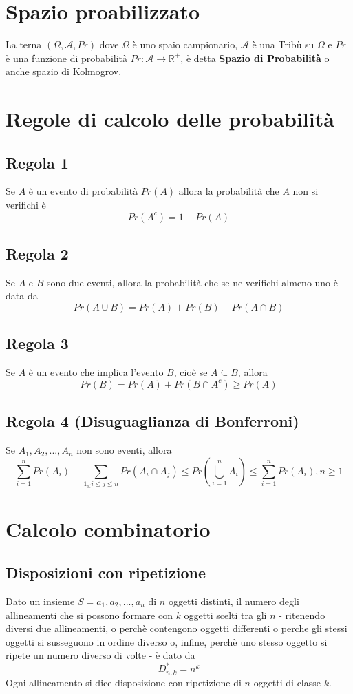 \documentclass[12pt]{report}
\begin{document}
  \section{Spazio proabilizzato}
  La terna $(\Omega, \mathcal{A}, Pr)$ dove $\Omega$ è uno spaio campionario, $\mathcal{A}$ è una Tribù su $\Omega$ e $Pr$ è una funzione di probabilità $Pr: \mathcal{A} \longrightarrow \mathbb{R^+}$, è detta \textbf{Spazio di Probabilità} o anche spazio di Kolmogrov.

  \section{Regole di calcolo delle probabilità}
  \subsection{Regola 1}
  Se $A$ è un evento di probabilità $Pr(A)$ allora la probabilità che $A$ non si verifichi è
  \[ Pr(A^c)=1-Pr(A) \]

  \subsection{Regola 2}
  Se $A$ e $B$ sono due eventi, allora la probabilità che se ne verifichi almeno uno è data da
  \[ Pr(A \cup B) = Pr(A) + Pr(B) - Pr(A \cap B) \]

  \subsection{Regola 3}
  Se $A$ è un evento che implica l'evento $B$, cioè se $A \subseteq B$, allora
  \[ Pr(B) = Pr(A) + Pr(B \cap A^c) \geq Pr(A) \]

  \subsection{Regola 4 (Disuguaglianza di Bonferroni)}
  Se $A_1, A_2, ..., A_n$ non sono eventi, allora
  \[ \sum_{i=1}^{n} Pr(A_i) - \sum_{1_\leq i \leq j \leq n} Pr(A_i \cap A_j) \leq Pr(\bigcup\limits_{i=1}^{n} A_i) \leq \sum_{i=1}^{n} Pr(A_i),     n \geq 1 \]

  \section{Calcolo combinatorio}
  \subsection{Disposizioni con ripetizione}
  Dato un insieme $S = {a_1,a_2,...,a_n}$ di $n$ oggetti distinti, il numero degli allineamenti che si possono formare con $k$ oggetti scelti tra gli $n$ - ritenendo diversi due allineamenti, o perchè contengono oggetti differenti o perche gli stessi oggetti si susseguono in ordine diverso o, infine, perchè uno stesso oggetto si ripete un numero diverso di volte - è dato da
  \[ D_{n,k}^* = n^k \]
  Ogni allineamento si dice disposizione con ripetizione di $n$ oggetti di classe $k$.
\end{document}

